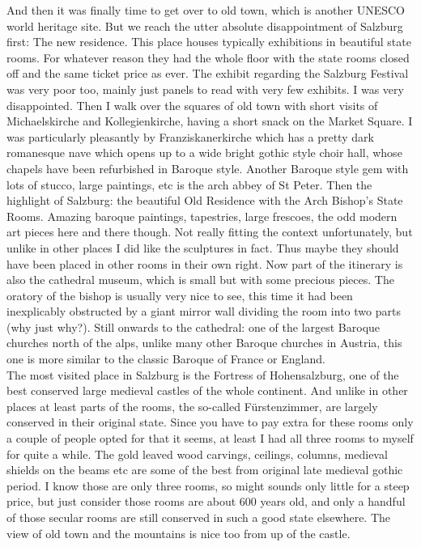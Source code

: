 And then it was finally time to get over to old town, which is another UNESCO world heritage site. But we reach the utter absolute disappointment of Salzburg first: The new residence. This place houses typically exhibitions in beautiful state rooms. For whatever reason they had the whole floor with the state rooms closed off and the same ticket price as ever. The exhibit regarding the Salzburg Festival was very poor too, mainly just panels to read with very few exhibits. I was very disappointed. Then I walk over the squares of old town with short visits of Michaelskirche and Kollegienkirche, having a short snack on the Market Square. I was particularly pleasantly by Franziskanerkirche which has a pretty dark romanesque nave which opens up to a wide bright gothic style choir hall, whose chapels have been refurbished in Baroque style. Another Baroque style gem with lots of stucco, large paintings, etc is the arch abbey of St Peter. Then the highlight of Salzburg: the beautiful Old Residence with the Arch Bishop's State Rooms. Amazing baroque paintings, tapestries, large frescoes, the odd modern art pieces here and there though. Not really fitting the context unfortunately, but unlike in other places I did like the sculptures in fact. Thus maybe they should have been placed in other rooms in their own right. Now part of the itinerary is also the cathedral museum, which is small but with some precious pieces. The oratory of the bishop is usually very nice to see, this time it had been inexplicably obstructed by a giant mirror wall dividing the room into two parts (why just why?). Still onwards to the cathedral: one of the largest Baroque churches north of the alps, unlike many other Baroque churches in Austria, this one is more similar to the classic Baroque of France or England. \\
The most visited place in Salzburg is the Fortress of Hohensalzburg, one of the best conserved large medieval castles of the whole continent. And unlike in other places at least parts of the rooms, the so-called F\"urstenzimmer, are largely conserved in their original state. Since you have to pay extra for these rooms only a couple of people opted for that it seems, at least I had all three rooms to myself for quite a while. The gold leaved wood carvings, ceilings, columns, medieval shields on the beams etc are some of the best from original late medieval gothic period. I know those are only three rooms, so might sounds only little for a steep price, but just consider those rooms are about 600 years old, and only a handful of those secular rooms are still conserved in such a good state elsewhere. The view of old town and the mountains is nice too from up of the castle. \\
